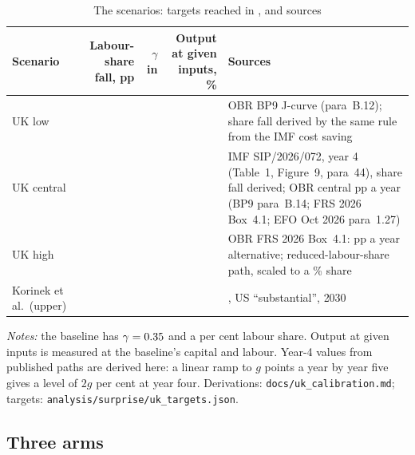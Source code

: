 \begin{table}[htbp]
\centering
\caption{The scenarios: targets reached in \genHeadYear{}, and sources}
\label{tab:calibration}
\small
\begin{tabular}{p{2.1cm}rrrp{5.6cm}}
\toprule
Scenario & \shortstack{Labour-share\\fall, pp} & \shortstack{$\gamma$ in\\\genHeadYear{}} & \shortstack{Output at given\\inputs, \%} & Sources \\
\midrule
UK low & \genUkLowFallPp{} & \genUkLowGammaTerminal{} & \genUkLowTfpPct{} & OBR BP9 J-curve (para~B.12); share fall derived by the same rule from the IMF cost saving \\
UK central & \genUkCentralFallPp{} & \genUkCentralGammaTerminal{} & \genUkCentralTfpPct{} & IMF SIP/2026/072, year 4 (Table~1, Figure~9, para~44), share fall derived; OBR central \genUkCentralObrBoostPp{}pp a year (BP9 para~B.14; FRS 2026 Box~4.1; EFO Oct 2026 para~1.27) \\
UK high & \genUkHighFallPp{} & \genUkHighGammaTerminal{} & \genUkHighTfpPct{} & OBR FRS 2026 Box~4.1: \genUkHighObrBoostPp{}pp a year alternative; reduced-labour-share path, scaled to a \genLabourShareBase{}\% share \\
Korinek et al.\ (upper) & \genKorinekFallPp{} & \genKorinekGammaTerminal{} & \genKorinekTfpPct{} & \citet[Table~3]{korinek2026}, US ``substantial'', 2030 \\
\bottomrule
\end{tabular}
\par\medskip
\begin{minipage}{0.95\textwidth}
\footnotesize \emph{Notes:} the baseline has $\gamma = 0.35{}$ and a \genLabourShareBase{} per cent labour share. Output at given inputs is measured at the baseline's \genRampZeroYear{} capital and labour. Year-4 values from published paths are derived here: a linear ramp to $g$ points a year by year five gives a level of $2g$ per cent at year four. Derivations: \texttt{docs/uk\_calibration.md}; targets: \texttt{analysis/surprise/uk\_targets.json}.
\end{minipage}
\end{table}

\subsection{Three arms}
\label{sec:arms}

